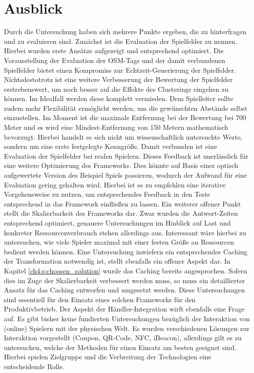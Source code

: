 \section{Ausblick}

Durch die Untersuchung haben sich mehrere Punkte ergeben, die zu hinterfragen und zu evaluieren sind. Zunächst ist die Evaluation der Spielfelder zu nennen. Hierbei wurden erste Ansätze aufgezeigt und entsprechend optimiert. Die Vorausstellung der Evaluation der OSM-Tags und der damit verbundenen Spielfelder bietet einen Kompromiss zur Echtzeit-Generierung der Spielfelder. Nichtsdestotrotz ist eine weitere Verbesserung der Bewertung der Spielfelder erstrebenswert, um noch besser auf die Effekte des Clusterings eingehen zu können. Im Idealfall werden diese komplett vermieden. Dem Spielleiter sollte zudem mehr Flexibilität ermöglicht werden, um die gewünschten Abstände selbst einzustellen. Im Moment ist die maximale Entfernung bei der Bewertung bei 700 Meter und es wird eine Mindest-Entfernung von 150 Metern  mathematisch bevorzugt. Hierbei handelt es sich nicht um wissenschaftlich untersuchte Werte, sondern um eine erste festgelegte Kenngröße.
Damit verbunden ist eine Evaluation der Spielfelder bei realen Spielern. Dieses Feedback ist unerlässlich für eine weitere Optimierung des Frameworks. Dies könnte auf Basis einer optisch aufgewertete Version des Beispiel Spiels passieren, wodurch der Aufwand für eine Evaluation gering gehalten wird.
Hierbei ist es zu empfehlen eine iterative Vorgehensweise zu nutzen, um entsprechendes Feedback in den Tests entsprechend in das Framework einfließen zu lassen.
Ein weiterer offener Punkt stellt die Skalierbarkeit des Frameworks dar. Zwar wurden die Antwort-Zeiten entsprechend optimiert, genauere Untersuchungen im Hinblick auf Last und konkreter Ressourcenverbrauch stehen allerdings aus. Interessant wäre hierbei zu untersuchen, wie viele Spieler maximal mit einer festen Größe an Ressourcen bedient werden können. Eine Untersuchung inwiefern ein entsprechendes Caching der Transformation notwendig ist, stellt ebenfalls ein offener Aspekt dar. In Kapitel \ref{ch4:s:choosen_solution} wurde das Caching bereits angesprochen. Sofern dies im Zuge der Skalierbarkeit verbessert werden muss, so muss ein detaillierter Ansatz für das Caching entworfen und umgesetzt werden. 
Diese Untersuchungen sind essentiell für den Einsatz eines solchen Frameworks für den Produktivbetrieb.
Der Aspekt der Händler-Integration wirft ebenfalls eine Frage auf. Es gibt bisher keine fundierten Untersuchungen bezüglich der Interaktion von (online) Spielern mit der physischen Welt. Es wurden verschiedenen Lösungen zur Interaktion vorgestellt (Coupon, QR-Code, NFC, iBeacon), allerdings gilt es zu untersuchen, welche der Methoden für einen Einsatz am besten geeignet sind. Hierbei spielen Zielgruppe und die Verbreitung der Technologien eine entscheidende Rolle.
